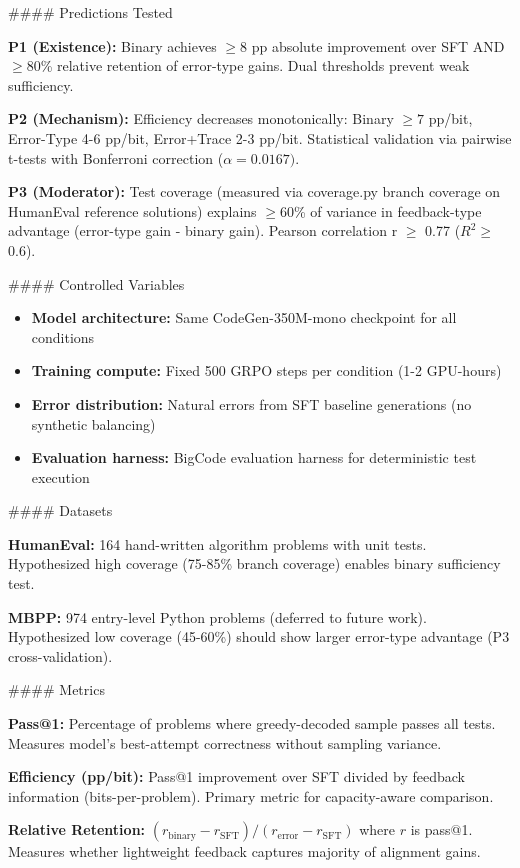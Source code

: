 \#\#\#\# Predictions Tested

\textbf{P1 (Existence):} Binary achieves $\geq 8$ pp absolute improvement over SFT AND $\geq 80$\% relative retention of error-type gains. Dual thresholds prevent weak sufficiency.

\textbf{P2 (Mechanism):} Efficiency decreases monotonically: Binary $\geq 7$ pp/bit, Error-Type 4-6 pp/bit, Error+Trace 2-3 pp/bit. Statistical validation via pairwise t-tests with Bonferroni correction ($\alpha =0.0167)$.

\textbf{P3 (Moderator):} Test coverage (measured via coverage.py branch coverage on HumanEval reference solutions) explains $\geq 60$\% of variance in feedback-type advantage (error-type gain - binary gain). Pearson correlation r $\geq$ 0.77 ($R^2 \geq$ 0.6).

\#\#\#\# Controlled Variables

\begin{itemize}
\item \textbf{Model architecture:} Same CodeGen-350M-mono checkpoint for all conditions
\item \textbf{Training compute:} Fixed 500 GRPO steps per condition (1-2 GPU-hours)
\item \textbf{Error distribution:} Natural errors from SFT baseline generations (no synthetic balancing)
\item \textbf{Evaluation harness:} BigCode evaluation harness for deterministic test execution
\end{itemize}

\#\#\#\# Datasets

\textbf{HumanEval:} 164 hand-written algorithm problems with unit tests. Hypothesized high coverage (75-85\% branch coverage) enables binary sufficiency test.

\textbf{MBPP:} 974 entry-level Python problems (deferred to future work). Hypothesized low coverage (45-60\%) should show larger error-type advantage (P3 cross-validation).

\#\#\#\# Metrics

\textbf{Pass@1:} Percentage of problems where greedy-decoded sample passes all tests. Measures model's best-attempt correctness without sampling variance.

\textbf{Efficiency (pp/bit):} Pass@1 improvement over SFT divided by feedback information (bits-per-problem). Primary metric for capacity-aware comparison.

\textbf{Relative Retention:} $(r_{\text{binary}} - r_{\text{SFT}}) / (r_{\text{error}} - r_{\text{SFT}})$ where $r$ is pass@1. Measures whether lightweight feedback captures majority of alignment gains.

